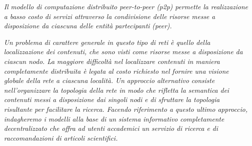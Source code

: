 \newcommand{\subsubsezione}[1]{%
 \def\thesubsubsection {\thetool.\arabic{section}.\arabic{subsection}.\arabic{subsubsection}}
 \subsubsection{#1}

 \def\thesubsubsection {\thechapter.\arabic{section}.\arabic{subsection}.\arabic{subsubsection}}
}




\textit{
Il modello di computazione distribuito peer-to-peer (p2p) permette la realizzazione a basso costo di servizi attraverso la condivisione delle risorse messe a disposizione da ciascuna delle entità partecipanti (\textit{peer}).
}

\textit{Un problema di carattere generale in questo tipo di reti è quello della localizzazione dei contenuti, che sono visti come risorse messe a disposizione da ciascun nodo. La maggiore difficoltà nel localizzare contenuti in maniera completamente distribuita è legata al costo richiesto nel fornire una visione globale della rete a ciascuna località. Un approccio alternativo consiste nell'organizzare la topologia della rete in modo che rifletta la semantica dei contenuti messi a disposizione dai singoli nodi e di sfruttare la topologia risultante per facilitare la ricerca. Facendo riferimento a questo ultimo approccio, indagheremo i modelli alla base di un sistema informativo completamente decentralizzato che offra ad utenti accademici un servizio di ricerca e di raccomandazioni di articoli scientifici.
}

